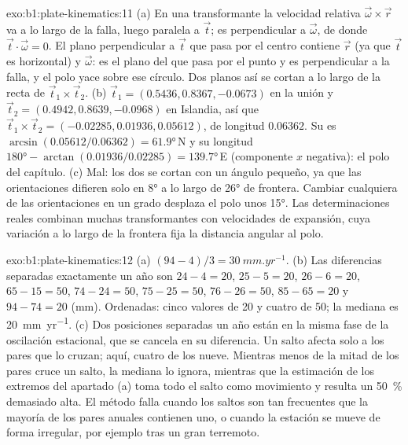 \begin{solution}{exo:b1:plate-kinematics:11}
(a) En una transformante la velocidad relativa $\vec\omega\times\vec r$ va a lo largo de la
falla, luego paralela a $\vec t$; es perpendicular a $\vec\omega$, de donde
$\vec t\cdot\vec\omega = 0$. El plano perpendicular a $\vec t$ que pasa por el
centro contiene $\vec r$ (ya que $\vec t$ es horizontal) y $\vec\omega$: es
el plano del  que pasa por el punto y es perpendicular a la falla,
y el polo yace sobre ese círculo. Dos planos así se cortan a lo largo de la recta de
$\vec t_1\times\vec t_2$. (b) $\vec t_1 = (0.5436, 0.8367, -0.0673)$ en la
unión y $\vec t_2 = (0.4942, 0.8639, -0.0968)$ en Islandia, así que
$\vec t_1\times\vec t_2 = (-0.02285, 0.01936, 0.05612)$, de longitud $0.06362$.
Su  es $\arcsin(0.05612/0.06362) = \ang{61.9}$\,N y su longitud
$\ang{180} - \arctan(0.01936/0.02285) = \ang{139.7}$\,E (componente $x$ negativa):
el polo del capítulo. (c) Mal: los dos  se cortan con un ángulo pequeño,
ya que las orientaciones difieren solo en \ang{8} a lo largo de \ang{26} de frontera.
Cambiar cualquiera de las orientaciones en un grado desplaza el polo unos \ang{15}. Las determinaciones reales combinan muchas transformantes con velocidades de expansión,
cuya variación a lo largo de la frontera fija la distancia angular al polo.
\end{solution}

\begin{solution}{exo:b1:plate-kinematics:12}
(a) $(94 - 4)/3 = \qty{30}{mm.yr^{-1}}$. (b) Las diferencias separadas exactamente un año son
$24 - 4 = 20$, $25 - 5 = 20$, $26 - 6 = 20$, $65 - 15 = 50$, $74 - 24 = 50$,
$75 - 25 = 50$, $76 - 26 = 50$, $85 - 65 = 20$ y $94 - 74 = 20$ (mm). Ordenadas:
cinco valores de 20 y cuatro de 50; la mediana es \qty{20}{mm.yr^{-1}}. (c) Dos
posiciones separadas un año están en la misma fase de la oscilación estacional,
que se cancela en su diferencia. Un salto afecta solo a los pares que lo cruzan;
aquí, cuatro de los nueve. Mientras menos de la mitad de los pares cruce un salto,
la mediana lo ignora, mientras que la estimación de los extremos del apartado (a) toma todo el salto
como movimiento y resulta un \qty{50}{\percent} demasiado alta. El método falla cuando
los saltos son tan frecuentes que la mayoría de los pares anuales contienen uno, o cuando la estación
se mueve de forma irregular, por ejemplo tras un gran terremoto.
\end{solution}

